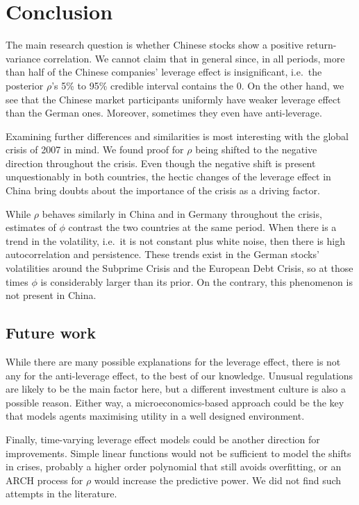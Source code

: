 \section{Conclusion}

The main research question is whether Chinese stocks show a positive return-variance correlation.
We cannot claim that in general since, in all periods, more than half of the Chinese companies' leverage effect is insignificant, i.e.\ the posterior $\rho$'s 5\% to 95\% credible interval contains the 0.
On the other hand, we see that the Chinese market participants uniformly have weaker leverage effect than the German ones.
Moreover, sometimes they even have anti-leverage.

Examining further differences and similarities is most interesting with the global crisis of 2007 in mind.
We found proof for $\rho$ being shifted to the negative direction throughout the crisis.
Even though the negative shift is present unquestionably in both countries, the hectic changes of the leverage effect in China bring doubts about the importance of the crisis as a driving factor.

While $\rho$ behaves similarly in China and in Germany throughout the crisis, estimates of $\phi$ contrast the two countries at the same period.
When there is a trend in the volatility, i.e.\ it is not constant plus white noise, then there is high autocorrelation and persistence.
These trends exist in the German stocks' volatilities around the Subprime Crisis and the European Debt Crisis, so at those times $\phi$ is considerably larger than its prior.
On the contrary, this phenomenon is not present in China.

\subsection*{Future work}

While there are many possible explanations for the leverage effect, there is not any for the anti-leverage effect, to the best of our knowledge.
Unusual regulations are likely to be the main factor here, but a different investment culture is also a possible reason.
Either way, a microeconomics-based approach could be the key that models agents maximising utility in a well designed environment.

Finally, time-varying leverage effect models could be another direction for improvements.
Simple linear functions would not be sufficient to model the shifts in crises, probably a higher order polynomial that still avoids overfitting, or an ARCH process for $\rho$ would increase the predictive power.
We did not find such attempts in the literature.

